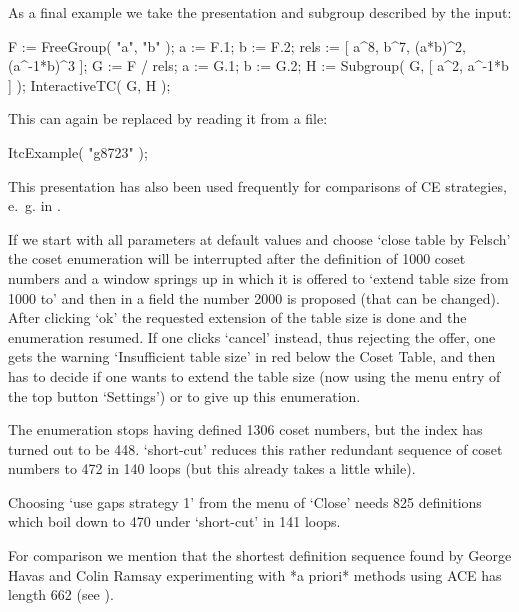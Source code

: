As a final example we take the presentation and subgroup described by
the {\GAP} input:

\begintt
F := FreeGroup( "a", "b" );
a := F.1; b := F.2;
rels := [ a^8, b^7, (a*b)^2, (a^-1*b)^3 ];
G := F / rels;
a := G.1; b := G.2;
H := Subgroup( G, [ a^2, a^-1*b ] );
InteractiveTC( G, H );
\endtt

This can again be replaced by reading it from a file:

\begintt
ItcExample( "g8723" );
\endtt

This presentation has also been used frequently for comparisons of CE
strategies, e.~g. in \cite{CDHW73}.

If we start with all parameters at default values and choose `close
table by Felsch' the coset enumeration will be interrupted after the
definition of 1000 coset numbers and a window springs up in which it
is offered to `extend table size from 1000 to' and then in a field the
number 2000 is proposed (that can be changed). After clicking `ok'
the requested extension of the table size is done and the enumeration
resumed. If one clicks `cancel' instead, thus rejecting the offer, one
gets the warning `Insufficient table size' in red below the Coset
Table, and then has to decide if one wants to extend the table size
(now using the menu entry of the top button `Settings') or to give up
this enumeration.

The enumeration stops having defined 1306 coset numbers, but the
index has turned out to be 448. `short-cut' reduces this rather
redundant sequence of coset numbers to 472 in 140 loops (but this
already takes a little while).

Choosing `use gaps strategy 1' from the menu of `Close' needs 825
definitions which boil down to 470 under `short-cut' in 141 loops.

For comparison we mention that the shortest definition sequence found
by George Havas and Colin Ramsay experimenting with *a priori*
methods using ACE has length 662 (see \cite{HR99a}).



